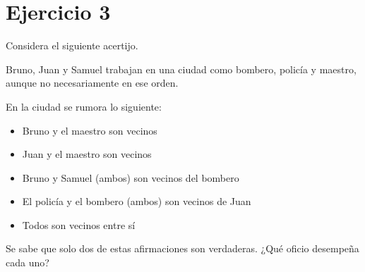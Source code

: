 \section{Ejercicio 3}

\begin{tcolorbox}[enunciado]
Considera el siguiente acertijo.

Bruno, Juan y Samuel trabajan en una ciudad como bombero, policía y maestro, aunque no necesariamente en ese orden.

En la ciudad se rumora lo siguiente:
\begin{itemize}[leftmargin=*]
    \item Bruno y el maestro son vecinos
    \item Juan y el maestro son vecinos
    \item Bruno y Samuel (ambos) son vecinos del bombero
    \item El policía y el bombero (ambos) son vecinos de Juan
    \item Todos son vecinos entre sí
\end{itemize}

Se sabe que solo dos de estas afirmaciones son verdaderas. ¿Qué oficio desempeña cada uno?
\end{tcolorbox}

